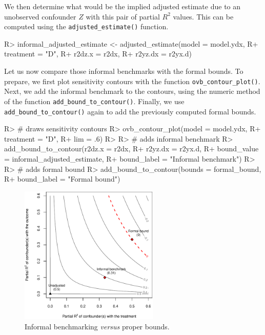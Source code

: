 \documentclass[
]{jss}
\begin{document}
We then determine what would be the implied adjusted estimate due to an
unobserved confounder \(Z\) with this pair of partial \(R^2\) values.
This can be computed using the \texttt{adjusted\_estimate()} function.

\begin{CodeChunk}

\begin{CodeInput}
R> informal_adjusted_estimate <- adjusted_estimate(model     = model.ydx, 
R+                                                 treatment = "D", 
R+                                                 r2dz.x    = r2dx, 
R+                                                 r2yz.dx   = r2yx.d)
\end{CodeInput}
\end{CodeChunk}

Let us now compare those informal benchmarks with the formal bounds. To
prepare, we first plot sensitivity contours with the function
\texttt{ovb\_contour\_plot()}. Next, we add the informal benchmark to
the contours, using the numeric method of the function
\texttt{add\_bound\_to\_contour()}. Finally, we use
\texttt{add\_bound\_to\_contour()} again to add the previously computed
formal bounds.

\begin{CodeChunk}

\begin{CodeInput}
R> # draws sensitivity contours
R> ovb_contour_plot(model = model.ydx,  
R+                  treatment = "D", 
R+                  lim = .6)
R> 
R> # adds informal benchmark 
R> add_bound_to_contour(r2dz.x = r2dx, 
R+                      r2yz.dx = r2yx.d, 
R+                      bound_value = informal_adjusted_estimate,
R+                      bound_label = "Informal benchmark")
R> 
R> # adds formal bound
R> add_bound_to_contour(bounds = formal_bound, 
R+                      bound_label = "Formal bound")
\end{CodeInput}
\begin{figure}[!tp]

{\centering \includegraphics[width=250px,height=250px]{jss_sensemakr_files/figure-latex/informal_benchmark_plot-1} 

}

\caption{\label{fig:naive_benchmarking}Informal benchmarking \emph{versus} proper bounds.}\label{fig:informal_benchmark_plot}
\end{figure}
\end{CodeChunk}
\end{document}
